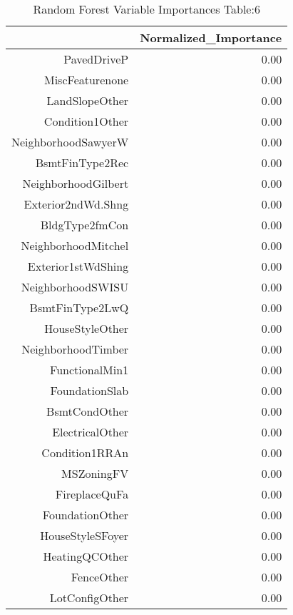 \begin{table}[ht]
\centering
\begin{tabular}{rr}
  \hline
 & Normalized\_Importance \\ 
  \hline
PavedDriveP & 0.00 \\ 
  MiscFeaturenone & 0.00 \\ 
  LandSlopeOther & 0.00 \\ 
  Condition1Other & 0.00 \\ 
  NeighborhoodSawyerW & 0.00 \\ 
  BsmtFinType2Rec & 0.00 \\ 
  NeighborhoodGilbert & 0.00 \\ 
  Exterior2ndWd.Shng & 0.00 \\ 
  BldgType2fmCon & 0.00 \\ 
  NeighborhoodMitchel & 0.00 \\ 
  Exterior1stWdShing & 0.00 \\ 
  NeighborhoodSWISU & 0.00 \\ 
  BsmtFinType2LwQ & 0.00 \\ 
  HouseStyleOther & 0.00 \\ 
  NeighborhoodTimber & 0.00 \\ 
  FunctionalMin1 & 0.00 \\ 
  FoundationSlab & 0.00 \\ 
  BsmtCondOther & 0.00 \\ 
  ElectricalOther & 0.00 \\ 
  Condition1RRAn & 0.00 \\ 
  MSZoningFV & 0.00 \\ 
  FireplaceQuFa & 0.00 \\ 
  FoundationOther & 0.00 \\ 
  HouseStyleSFoyer & 0.00 \\ 
  HeatingQCOther & 0.00 \\ 
  FenceOther & 0.00 \\ 
  LotConfigOther & 0.00 \\ 
   \hline
\end{tabular}
\caption{Random Forest Variable Importances Table:6} 
\label{tab:importance6}
\end{table}

